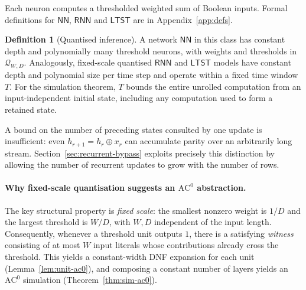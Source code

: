 \documentclass[11pt]{article}
\newcommand{\AC}{\mathrm{AC}}
\newcommand{\NN}{\mathsf{NN}}
\newcommand{\RNN}{\mathsf{RNN}}
\newcommand{\LTST}{\mathsf{LTST}}
\newcommand{\Qset}{\mathcal{Q}}
\theoremstyle{plain}
\theoremstyle{definition}
\newtheorem{definition}[theorem]{Definition}
\theoremstyle{remark}
\numberwithin{equation}{section}
\begin{document}
Each neuron computes a thresholded weighted sum of Boolean inputs. Formal definitions for $\NN$, $\RNN$ and $\LTST$ are in Appendix~\ref{app:defs}.

\begin{definition}[Quantised inference]
\label{def:quantised-inference}
A network $\NN$ in this class has constant depth and polynomially many threshold neurons, with weights and thresholds in $\Qset_{W,D}$.
Analogously, fixed-scale quantised $\RNN$ and $\LTST$ models have constant depth and polynomial size per time step and operate within a fixed time window $T$.
For the simulation theorem, $T$ bounds the entire unrolled computation from an input-independent initial state, including any computation used to form a retained state.
\end{definition}

A bound on the number of preceding states consulted by one update is insufficient: even $h_{r+1}=h_r\oplus x_r$ can accumulate parity over an arbitrarily long stream. Section~\ref{sec:recurrent-bypass} exploits precisely this distinction by allowing the number of recurrent updates to grow with the number of rows.

\paragraph{Why fixed-scale quantisation suggests an $\AC^0$ abstraction.}
The key structural property is \emph{fixed scale}: the smallest nonzero weight is $1/D$ and the largest threshold is $W/D$, with $W,D$ independent of the input length.
Consequently, whenever a threshold unit outputs $1$, there is a satisfying \emph{witness} consisting of at most $W$ input literals whose contributions already cross the threshold.
This yields a constant-width DNF expansion for each unit (Lemma~\ref{lem:unit-ac0}), and composing a constant number of layers yields an $\AC^0$ simulation (Theorem~\ref{thm:sim-ac0}).
\end{document}

